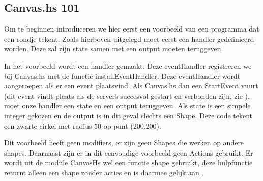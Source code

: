 \subsection{Canvas.hs 101}
Om te beginnen introduceren we hier eerst een voorbeeld van een programma dat een rondje tekent. Zoals hierboven uitgelegd moet eerst een handler gedefinieerd worden. Deze zal zijn state samen met een output moeten teruggeven.



In het voorbeeld wordt een handler gemaakt. Deze eventHandler registreren we bij Canvas.hs met de functie installEventHandler. Deze eventHandler wordt aangeroepen als er een event plaatsvind. Als Canvas.hs dan een StartEvent vuurt (dit event vindt plaats als de servers succesvol gestart en verbonden zijn, zie ), moet onze handler een state en een output teruggeven. Als state is een simpele integer gekozen en de output is in dit geval slechts een Shape. Deze code tekent een zwarte cirkel met radius 50 op punt (200,200).

Dit voorbeeld heeft geen modifiers, er zijn geen Shapes die werken op andere shapes. Daarnaast zijn er in dit eenvoudige voorbeeld geen Actions gebruikt. Er wordt uit de module CanvasHs wel een functie shape gebruikt, deze hulpfunctie returnt alleen een shape zonder acties en is daarmee gelijk aan .
